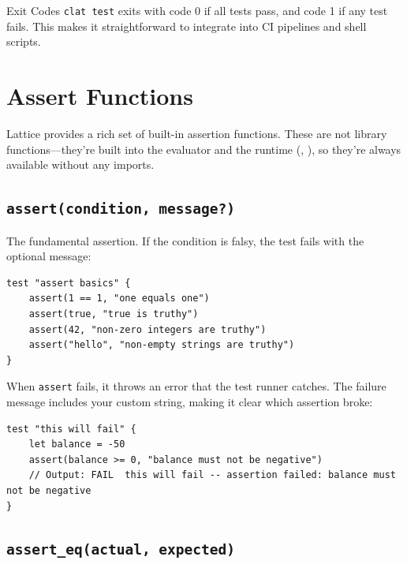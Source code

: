 \begin{tipbox}{Exit Codes}
\lstinline|clat test| exits with code 0 if all tests pass, and code 1 if any test fails.
This makes it straightforward to integrate into CI pipelines and shell scripts.
\end{tipbox}

\section{Assert Functions}\label{sec:assert-functions}

Lattice provides a rich set of built-in assertion functions.
These are not library functions---they're built into the evaluator and the runtime (, ), so they're always available without any imports.

\subsection{\texttt{assert(condition, message?)}}\label{sec:assert-basic}

The fundamental assertion.
If the condition is falsy, the test fails with the optional message:

\begin{lstlisting}[language=Lattice, caption={Basic assert usage}]
test "assert basics" {
    assert(1 == 1, "one equals one")
    assert(true, "true is truthy")
    assert(42, "non-zero integers are truthy")
    assert("hello", "non-empty strings are truthy")
}
\end{lstlisting}

When \lstinline|assert| fails, it throws an error that the test runner catches.
The failure message includes your custom string, making it clear which assertion broke:

\begin{lstlisting}[language=Lattice, caption={A failing assert}]
test "this will fail" {
    let balance = -50
    assert(balance >= 0, "balance must not be negative")
    // Output: FAIL  this will fail -- assertion failed: balance must not be negative
}
\end{lstlisting}

\subsection{\texttt{assert\_eq(actual, expected)}}\label{sec:assert-eq}

